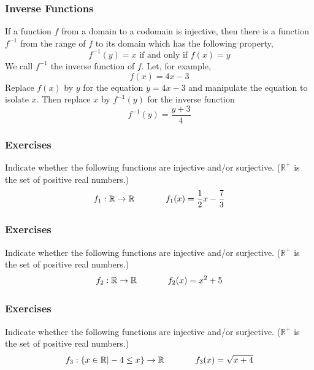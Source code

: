 \documentclass[xcolor=dvipsnames]{beamer}
\begin{document}
\begin{frame}
  \frametitle{Inverse Functions}
If a function $f$ from a domain to a codomain is injective, then there
is a function $f^{-1}$ from the range of $f$ to its domain which has
the following property,
\begin{equation}
  \label{eq:noexiedi}
  f^{-1}(y)=x\mbox{ if and only if }f(x)=y
\end{equation}
We call $f^{-1}$ the \alert{inverse function} of $f$. Let, for
example,
\begin{equation}
  \label{eq:iengaihu}
  f(x)=4x-3
\end{equation}
Replace $f(x)$ by $y$ for the equation $y=4x-3$ and manipulate the
equation to isolate $x$. Then replace $x$ by $f^{-1}(y)$ for the
inverse function
\begin{equation}
  \label{eq:eimoofie}
  f^{-1}(y)=\frac{y+3}{4}
\end{equation}
\end{frame}

\begin{frame}
  \frametitle{Exercises}
  {\ubung} Indicate whether the following functions are injective
  and/or surjective. ($\mathbb{R}^{+}$ is the set of positive real
  numbers.)
\begin{equation}
  \label{eq:oapaedah}
  f_{1}:\mathbb{R}\rightarrow\mathbb{R}\hspace{.5in}f_{1}(x)=\frac{1}{2}x-\frac{7}{3}
\end{equation}
\end{frame}

\begin{frame}
  \frametitle{Exercises}
  {\ubung} Indicate whether the following functions are injective
  and/or surjective. ($\mathbb{R}^{+}$ is the set of positive real
  numbers.)
\begin{equation}
  \label{eq:ariwioga}
  f_{2}:\mathbb{R}\rightarrow\mathbb{R}\hspace{.5in}f_{2}(x)=x^{2}+5
\end{equation}
\end{frame}

\begin{frame}
  \frametitle{Exercises}
  {\ubung} Indicate whether the following functions are injective
  and/or surjective. ($\mathbb{R}^{+}$ is the set of positive real
  numbers.)
\begin{equation}
  \label{eq:aeghahpi}
  f_{3}:\{x\in\mathbb{R}|-4\leq{}x\}\rightarrow\mathbb{R}\hspace{.5in}f_{3}(x)=\sqrt{x+4}
\end{equation}
\end{frame}
\end{document}
